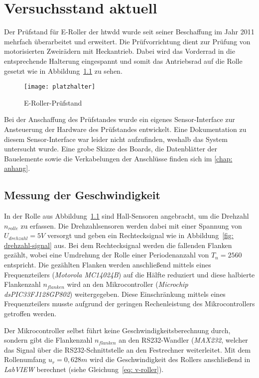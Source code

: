 \chapter{Versuchsstand aktuell}%
Der Prüfstand für E-Roller der \gls{htwdd} wurde seit seiner Beschaffung im Jahr 2011 mehrfach überarbeitet und erweitert. Die Prüfvorrichtung dient zur Prüfung von motorisierten Zweirädern mit Heckantrieb. Dabei wird das Vorderrad in die entsprechende Halterung eingespannt und somit das Antriebsrad auf die Rolle gesetzt wie in Abbildung~\ref{fig: rollerpruefstand} zu sehen.
\begin{figure}[!hbt]
\texttt{[image: platzhalter]}
\caption{E-Roller-Prüfstand}
\label{fig: rollerpruefstand}
\end{figure}

Bei der Anschaffung des Prüfstandes wurde ein eigenes Sensor-Interface zur Ansteuerung der Hardware des Prüfstandes entwickelt. \cite[][S. 32ff]{reuter} 
Eine Dokumentation zu diesem Sensor-Interface war leider nicht aufzufinden, weshalb das System untersucht wurde. Eine grobe Skizze des Boards, die Datenblätter der Bauelemente sowie die Verkabelungen der Anschlüsse finden sich im \ref{chap: anhang}.

\section{Messung der Geschwindigkeit}
In der Rolle aus Abbildung~\ref{fig: rollerpruefstand} sind Hall-Sensoren angebracht, um die Drehzahl $n_{rolle}$ zu erfassen. Die Drehzahlsensoren werden dabei mit einer Spannung von $U_{drehzahl} = 5 V$ versorgt und geben ein Rechtecksignal wie in Abbildung~\ref{fig: drehzahl-signal} aus. Bei dem Rechtecksignal werden die fallenden Flanken gezählt, wobei eine Umdrehung der Rolle einer Periodenanzahl von  $T_n = 2560$ entspricht. Die gezählten Flanken werden anschließend mittels eines Frequenzteilers (\emph{Motorola MC14024B}) auf die Hälfte reduziert und diese halbierte Flankenzahl $n_{flanken}$ wird an den Mikrocontroller (\emph{Microchip dsPIC33FJ128GP802}) weitergegeben. Diese Einschränkung mittels eines Frequenzteilers musste aufgrund der geringen Rechenleistung des Mikrocontrollers getroffen werden. \cite[][S. 42]{reuter}

Der Mikrocontroller selbst führt keine Geschwindigkeitsberechnung durch, sondern gibt die Flankenzahl $n_{flanken}$ an den RS232-Wandler (\emph{MAX232}, welcher das Signal über die RS232-Schnittstelle an den Festrechner weiterleitet. Mit dem Rollenumfang $u_r = 0,628m$ wird die Geschwindigkeit des Rollers anschließend in \emph{LabVIEW} berechnet (siehe Gleichung~\ref{eq: v-roller}).

